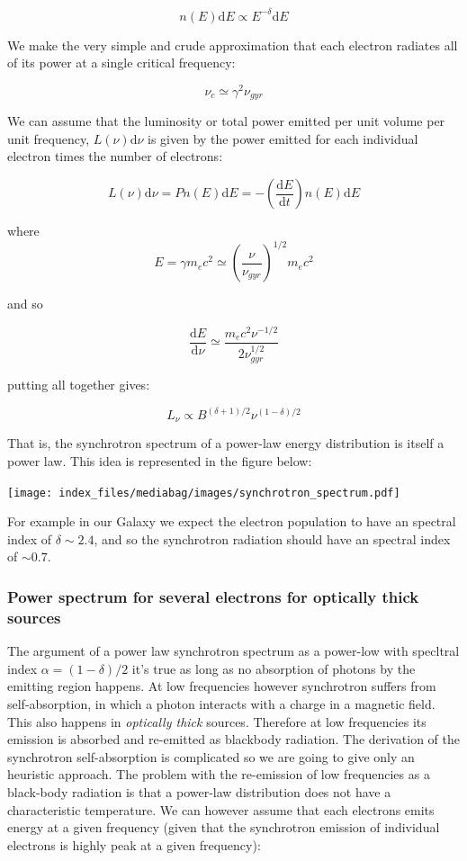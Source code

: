 \documentclass[
  letterpaper,
  DIV=11,
  numbers=noendperiod]{scrreprt}
\begin{document}
\[n(E) \mathrm{d}E \propto E^{-\delta}\mathrm{d}E\]

We make the very simple and crude approximation that each electron
radiates all of its power at a single critical frequency:

\[\nu_c \simeq \gamma^2\nu_{gyr}\]

We can assume that the luminosity or total power emitted per unit volume
per unit frequency, \(L(\nu)\mathrm{d}\nu\) is given by the power
emitted for each individual electron times the number of electrons:

\[ L (\nu) \mathrm{d}\nu = P n(E)\mathrm{d}E = -\left(\frac{\mathrm{d}E}{\mathrm{d}t}\right) n(E)\mathrm{d}E \]

where
\[E = \gamma m_e c^2 \simeq \left(\frac{\nu}{\nu_{gyr}}\right)^{1/2}m_e c^2\]

and so

\[\frac{\mathrm{d}E}{\mathrm{d}\nu} \simeq \frac{m_e c^2 \nu^{-1/2}}{2\nu_{gyr}^{1/2}}\]

putting all together gives:

\[L_\nu \propto B^{(\delta+1)/2}\nu^{(1-\delta)/2}\]

That is, the synchrotron spectrum of a power-law energy distribution is
itself a power law. This idea is represented in the figure below:

\texttt{[image: index\_files/mediabag/images/synchrotron\_spectrum.pdf]}

For example in our Galaxy we expect the electron population to have an
spectral index of \(\delta \sim 2.4\), and so the synchrotron radiation
should have an spectral index of \(\sim 0.7\).

\subsubsection{Power spectrum for several electrons for optically thick
sources}\label{power-spectrum-for-several-electrons-for-optically-thick-sources}

The argument of a power law synchrotron spectrum as a power-low with
specltral index \(\alpha = (1 - \delta)/2\) it's true as long as no
absorption of photons by the emitting region happens. At low frequencies
however synchrotron suffers from self-absorption, in which a photon
interacts with a charge in a magnetic field. This also happens in
\emph{optically thick} sources. Therefore at low frequencies its
emission is absorbed and re-emitted as blackbody radiation. The
derivation of the synchrotron self-absorption is complicated so we are
going to give only an heuristic approach. The problem with the
re-emission of low frequencies as a black-body radiation is that a
power-law distribution does not have a characteristic temperature. We
can however assume that each electrons emits energy at a given frequency
(given that the synchrotron emission of individual electrons is highly
peak at a given frequency):
\end{document}
